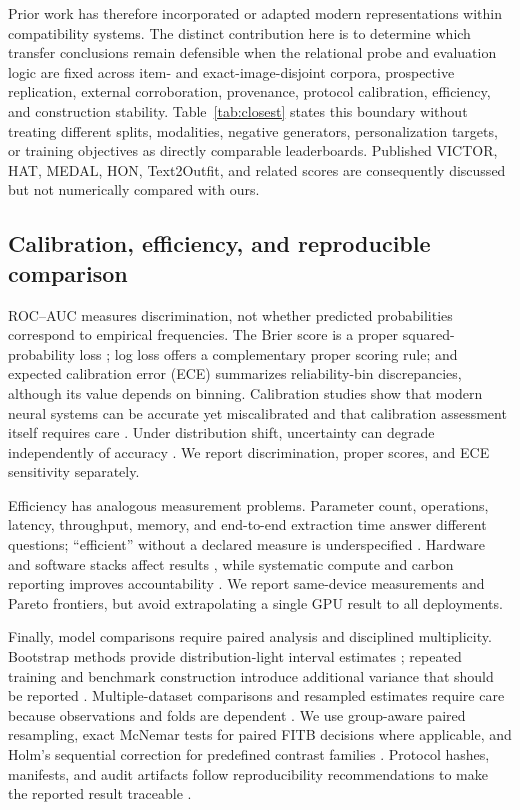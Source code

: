 \documentclass[pdflatex,sn-mathphys-num,iicol]{sn-jnl}
\begin{document}
Prior work has therefore incorporated or adapted modern representations within compatibility systems. The distinct contribution here is to determine which transfer conclusions remain defensible when the relational probe and evaluation logic are fixed across item- and exact-image-disjoint corpora, prospective replication, external corroboration, provenance, protocol calibration, efficiency, and construction stability. Table~\ref{tab:closest} states this boundary without treating different splits, modalities, negative generators, personalization targets, or training objectives as directly comparable leaderboards. Published VICTOR, HAT, MEDAL, HON, Text2Outfit, and related scores are consequently discussed but not numerically compared with ours.

\subsection{Calibration, efficiency, and reproducible comparison}

ROC--AUC measures discrimination, not whether predicted probabilities correspond to empirical frequencies. The Brier score is a proper squared-probability loss \cite{brier1950}; log loss offers a complementary proper scoring rule; and expected calibration error (ECE) summarizes reliability-bin discrepancies, although its value depends on binning. Calibration studies show that modern neural systems can be accurate yet miscalibrated and that calibration assessment itself requires care \cite{niculescu2005probabilities,guo2017calibration,naeini2015calibration,vaicenavicius2019calibration,minderer2021revisiting}. Under distribution shift, uncertainty can degrade independently of accuracy \cite{ovadia2019uncertainty}. We report discrimination, proper scores, and ECE sensitivity separately.

Efficiency has analogous measurement problems. Parameter count, operations, latency, throughput, memory, and end-to-end extraction time answer different questions; ``efficient'' without a declared measure is underspecified \cite{dehghani2022efficiency}. Hardware and software stacks affect results \cite{hooker2021hardware}, while systematic compute and carbon reporting improves accountability \cite{schwartz2020green,henderson2020reporting,dodge2022carbon}. We report same-device measurements and Pareto frontiers, but avoid extrapolating a single GPU result to all deployments.

Finally, model comparisons require paired analysis and disciplined multiplicity. Bootstrap methods provide distribution-light interval estimates \cite{efron1994bootstrap}; repeated training and benchmark construction introduce additional variance that should be reported \cite{bouthillier2021variance}. Multiple-dataset comparisons and resampled estimates require care because observations and folds are dependent \cite{demsar2006statistical,nadeau2003inference}. We use group-aware paired resampling, exact McNemar tests for paired FITB decisions where applicable, and Holm's sequential correction for predefined contrast families \cite{holm1979}. Protocol hashes, manifests, and audit artifacts follow reproducibility recommendations to make the reported result traceable \cite{pineau2021reproducibility}.
\end{document}
